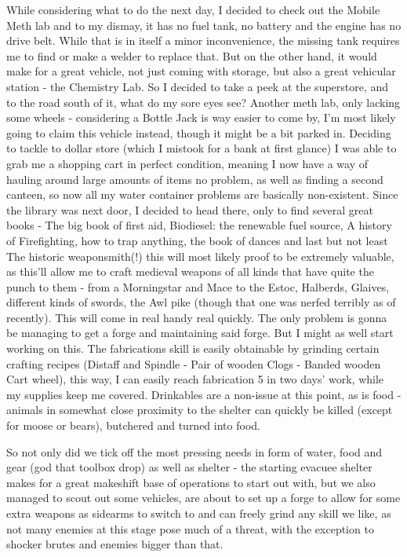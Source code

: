 While considering what to do the next day, I decided to check out the Mobile Meth lab and to my dismay, it has no fuel tank, no battery and the engine has no drive belt. While that is in itself a minor inconvenience, the missing tank requires me to find or make a welder to replace that. But on the other hand, it would make for a great vehicle, not just coming with storage, but also a great vehicular station - the Chemistry Lab. So I decided to take a peek at the superstore, and to the road south of it, what do my sore eyes see? Another meth lab, only lacking some wheels - considering a Bottle Jack is way easier to come by, I'm most likely going to claim this vehicle instead, though it might be a bit parked in. Deciding to tackle to dollar store (which I mistook for a bank at first glance) I was able to grab me a shopping cart in perfect condition, meaning I now have a way of hauling around large amounts of items no problem, as well as finding a second canteen, so now all my water container problems are basically non-existent. Since the library was next door, I decided to head there, only to find several great books - The big book of first aid, Biodiesel: the renewable fuel source, A history of Firefighting, how to trap anything, the book of dances and last but not least The historic weaponsmith(!) this will most likely proof to be extremely valuable, as this'll allow me to craft medieval weapons of all kinds that have quite the punch to them - from a Morningstar and Mace to the Estoc, Halberds, Glaives, different kinds of swords, the Awl pike (though that one was nerfed terribly as of recently). This will come in real handy real quickly. The only problem is gonna be managing to get a forge and maintaining said forge. But I might as well start working on this. The fabrications skill is easily obtainable by grinding certain crafting recipes (Distaff and Spindle - Pair of wooden Clogs - Banded wooden Cart wheel), this way, I can easily reach fabrication 5 in two days' work, while my supplies keep me covered. Drinkables are a non-issue at this point, as is food - animals in somewhat close proximity to the shelter can quickly be killed (except for moose or bears), butchered and turned into food.

So not only did we tick off the most pressing needs in form of water, food and gear (god that toolbox drop) as well as shelter - the starting evacuee shelter makes for a great makeshift base of operations to start out with, but we also managed to scout out some vehicles, are about to set up a forge to allow for some extra weapons as sidearms to switch to and can freely grind any skill we like, as not many enemies at this stage pose much of a threat, with the exception to shocker brutes and enemies bigger than that.

